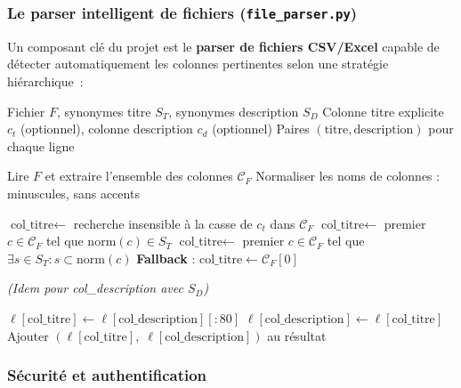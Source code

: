 \documentclass[12pt, a4paper]{article}
\begin{document}
\subsubsection{Le parser intelligent de fichiers (\texttt{file\_parser.py})}

Un composant clé du projet est le \textbf{parser de fichiers CSV/Excel} capable de détecter automatiquement les colonnes pertinentes selon une stratégie hiérarchique~:

\begin{algorithm}[H]
\caption{Détection automatique des colonnes titre et description}
\label{alg:parser}
\begin{algorithmic}[1]
\Require Fichier $F$, synonymes titre $S_T$, synonymes description $S_D$
\Require Colonne titre explicite $c_t$ (optionnel), colonne description $c_d$ (optionnel)
\Ensure Paires $(\text{titre}, \text{description})$ pour chaque ligne

\State Lire $F$ et extraire l'ensemble des colonnes $\mathcal{C}_{F}$
\State Normaliser les noms de colonnes : minuscules, sans accents

  \State $\text{col\_titre} \leftarrow$ recherche insensible à la casse de $c_t$ dans $\mathcal{C}_F$
\Else
  \State $\text{col\_titre} \leftarrow$ premier $c \in \mathcal{C}_F$ tel que $\mathrm{norm}(c) \in S_T$
    \State $\text{col\_titre} \leftarrow$ premier $c \in \mathcal{C}_F$ tel que $\exists s \in S_T : s \subset \mathrm{norm}(c)$
  \EndIf
   \textbf{Fallback} : $\text{col\_titre} \leftarrow \mathcal{C}_F[0]$ \EndIf
\EndIf

\State \textit{(Idem pour col\_description avec $S_D$)}

    \State $\ell[\text{col\_titre}] \leftarrow \ell[\text{col\_description}][:80]$
  \EndIf
    \State $\ell[\text{col\_description}] \leftarrow \ell[\text{col\_titre}]$
  \EndIf
  \State Ajouter $(\ell[\text{col\_titre}],\; \ell[\text{col\_description}])$ au résultat
\EndFor
\end{algorithmic}
\end{algorithm}

\subsubsection{Sécurité et authentification}
\end{document}

